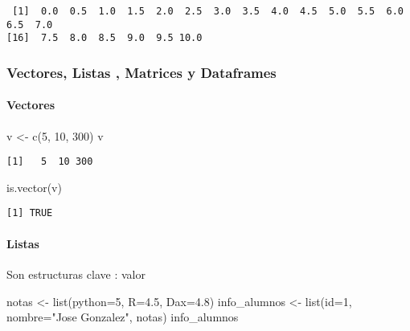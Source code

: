 \documentclass[
  letterpaper,
  DIV=11,
  numbers=noendperiod]{scrartcl}
\let\oldparagraph\paragraph
\renewcommand{\paragraph}[1]{\oldparagraph{#1}\mbox{}}
\newenvironment{Shaded}{\begin{snugshade}}{\end{snugshade}}
\newcommand{\AttributeTok}[1]{\textcolor[rgb]{0.40,0.45,0.13}{#1}}
\newcommand{\DecValTok}[1]{\textcolor[rgb]{0.68,0.00,0.00}{#1}}
\newcommand{\FloatTok}[1]{\textcolor[rgb]{0.68,0.00,0.00}{#1}}
\newcommand{\FunctionTok}[1]{\textcolor[rgb]{0.28,0.35,0.67}{#1}}
\newcommand{\NormalTok}[1]{\textcolor[rgb]{0.00,0.23,0.31}{#1}}
\newcommand{\OtherTok}[1]{\textcolor[rgb]{0.00,0.23,0.31}{#1}}
\newcommand{\StringTok}[1]{\textcolor[rgb]{0.13,0.47,0.30}{#1}}
\begin{document}
\begin{verbatim}
 [1]  0.0  0.5  1.0  1.5  2.0  2.5  3.0  3.5  4.0  4.5  5.0  5.5  6.0  6.5  7.0
[16]  7.5  8.0  8.5  9.0  9.5 10.0
\end{verbatim}

\subsubsection{Vectores, Listas , Matrices y
Dataframes}\label{vectores-listas-matrices-y-dataframes}

\paragraph{Vectores}\label{vectores}

\begin{Shaded}
\begin{Highlighting}[]
\NormalTok{v }\OtherTok{\textless{}{-}} \FunctionTok{c}\NormalTok{(}\DecValTok{5}\NormalTok{, }\DecValTok{10}\NormalTok{, }\DecValTok{300}\NormalTok{)}
\NormalTok{v}
\end{Highlighting}
\end{Shaded}

\begin{verbatim}
[1]   5  10 300
\end{verbatim}

\begin{Shaded}
\begin{Highlighting}[]
\FunctionTok{is.vector}\NormalTok{(v)}
\end{Highlighting}
\end{Shaded}

\begin{verbatim}
[1] TRUE
\end{verbatim}

\paragraph{Listas}\label{listas}

Son estructuras clave : valor

\begin{Shaded}
\begin{Highlighting}[]
\NormalTok{notas }\OtherTok{\textless{}{-}} \FunctionTok{list}\NormalTok{(}\AttributeTok{python=}\DecValTok{5}\NormalTok{, }\AttributeTok{R=}\FloatTok{4.5}\NormalTok{, }\AttributeTok{Dax=}\FloatTok{4.8}\NormalTok{)}
\NormalTok{info\_alumnos }\OtherTok{\textless{}{-}} \FunctionTok{list}\NormalTok{(}\AttributeTok{id=}\DecValTok{1}\NormalTok{, }\AttributeTok{nombre=}\StringTok{"Jose Gonzalez"}\NormalTok{, notas)}
\NormalTok{info\_alumnos}
\end{Highlighting}
\end{Shaded}
\end{document}
